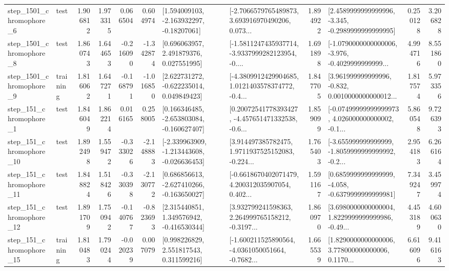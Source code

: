 \begin{tabular}{llrrrrllrlrr}
  step\_1501\_chromophore\_6 &      test &      1.906812 &    1.973315 &      0.066504 &  0.604974 &    [1.594009103, -2.163932297, -0.18207061] &  [-2.7066579765489873, 3.693916970490206, 0.073... &       1.894922 &  [2.4589999999999996, -3.345, -0.2989999999999995] &            0.250128 &          3.206828 \\
  step\_1501\_chromophore\_8 &      test &      1.860743 &    1.644653 &     -0.216090 & -1.342874 &     [0.696063957, 2.491879376, 0.027551995] &  [-1.5811247435937714, -3.9337999282123954, -0.... &       1.691898 &  [-1.0790000000000006, -3.976, -0.4029999999999... &            4.994716 &          8.551860 \\
  step\_1501\_chromophore\_9 &  training &      1.816062 &    1.647271 &     -0.168791 & -1.016850 &    [2.622731272, -0.622235014, 0.049849423] &  [-4.3809912429904685, 1.0121403578374772, -0.4... &       1.847705 &  [3.961999999999996, -0.832, 0.0010000000000012... &            1.817574 &          5.973356 \\
   step\_151\_chromophore\_1 &      test &      1.846049 &    1.862214 &      0.016165 &  0.258005 &   [0.166346485, -2.653803084, -0.160627407] &  [0.20072541778393427, -4.457651471332538, -0.6... &       1.859099 &  [-0.07499999999999973, 4.026000000000002, -0.1... &            5.860548 &          9.726393 \\
  step\_151\_chromophore\_10 &      test &      1.892498 &    1.559472 &     -0.333026 & -2.148883 &  [-2.339963909, -1.213443608, -0.026636453] &  [3.914497385782475, 1.9711937525152083, -0.224... &       1.765403 &  [-3.655999999999999, -1.8059999999999992, -0.2... &            2.954183 &          6.266164 \\
  step\_151\_chromophore\_11 &      test &      1.848824 &    1.518426 &     -0.330398 & -2.130772 &   [0.686856613, -2.627410266, -0.163650027] &  [-0.6618670402071479, 4.200312035907054, 0.402... &       1.591167 &  [0.6859999999999999, -4.058, -0.6379999999999981] &            7.349247 &          3.459974 \\
  step\_151\_chromophore\_12 &      test &      1.891709 &    1.750942 &     -0.140767 & -0.823693 &    [2.315440851, 1.349576942, -0.416530344] &  [3.932799241598363, 2.264999765158212, -0.3197... &       1.860970 &  [3.6980000000000004, 1.8229999999999986, -0.49... &            4.453189 &          4.600630 \\
  step\_151\_chromophore\_15 &  training &      1.810483 &    1.790244 &     -0.020239 &  0.007079 &     [0.998226829, 2.551817543, 0.311599216] &  [-1.600211525890564, -4.0361050051664, -0.7682... &       1.665539 &  [1.8290000000000006, 3.778000000000006, 0.1170... &            6.616096 &          9.416163 \\

\end{tabular}

